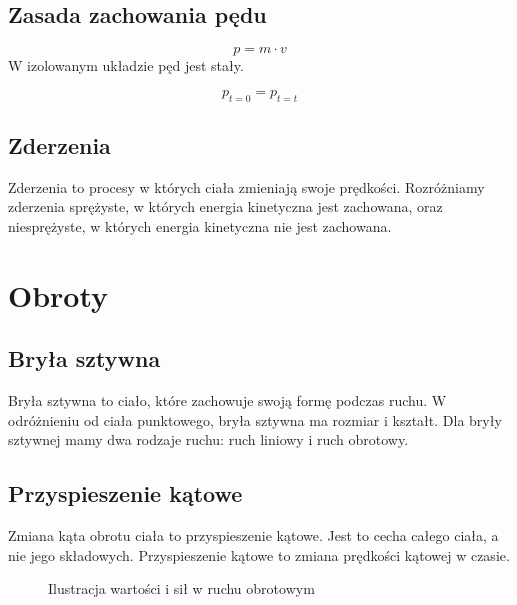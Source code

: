 \documentclass{../notatki}
\begin{document}
\subsection{Zasada zachowania pędu}

$$
p = m \cdot v
$$
W izolowanym układzie pęd jest stały.

$$
p_{t=0} = p_{t=t}
$$

\subsection{Zderzenia}

Zderzenia to procesy w których ciała zmieniają swoje prędkości. Rozróżniamy
zderzenia sprężyste, w których energia kinetyczna jest zachowana, oraz
niesprężyste, w których energia kinetyczna nie jest zachowana.

\section{Obroty}

\subsection{Bryła sztywna}

Bryła sztywna to ciało, które zachowuje swoją formę podczas ruchu. W odróżnieniu
od ciała punktowego, bryła sztywna ma rozmiar i kształt. Dla bryły sztywnej
mamy dwa rodzaje ruchu: ruch liniowy i ruch obrotowy.

\subsection{Przyspieszenie kątowe}

Zmiana kąta obrotu ciała to przyspieszenie kątowe. Jest to cecha całego ciała,
a nie jego składowych. Przyspieszenie kątowe to zmiana prędkości kątowej
w czasie.
\begin{figure*}[ht]
  \centering
  \caption{Ilustracja wartości i sił w ruchu obrotowym}
\end{figure*}
\end{document}
